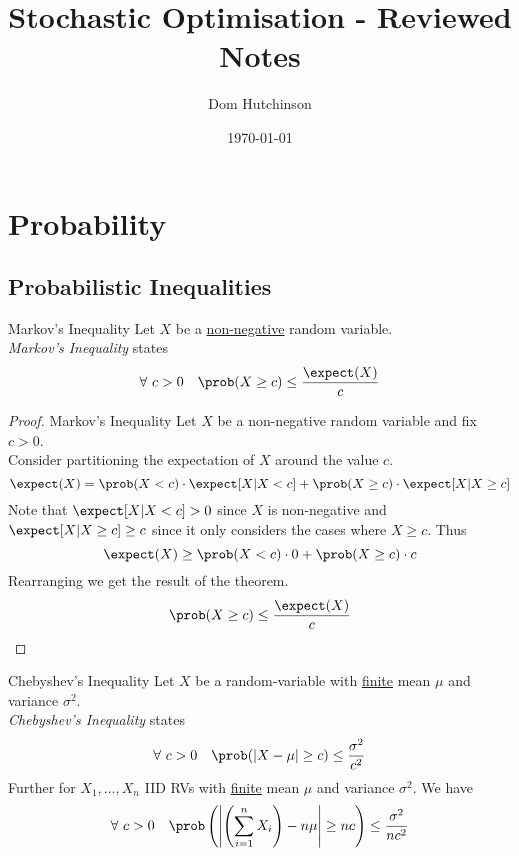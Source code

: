 \documentclass[11pt,a4paper]{article}
\begin{document}
\title{Stochastic Optimisation - Reviewed Notes}
\author{Dom Hutchinson}
\date{\today}
\maketitle

\tableofcontents\newpage

\section{Probability}

\subsection{Probabilistic Inequalities}

  \begin{theorem}{Markov's Inequality}
    Let $X$ be a \underline{non-negative} random variable.\\
    \textit{Markov's Inequality} states
    \[ \forall\ c>0\quad\prob(X\geq c)\leq\frac{\expect(X)}c \]
  \end{theorem}

  \begin{proof}{Markov's Inequality}
    Let $X$ be a non-negative random variable and fix $c>0$.\\
    Consider partitioning the expectation of $X$ around the value $c$.
    \[ \expect(X)=\prob(X<c)\cdot\expect[X|X<c]+\prob(X\geq c)\cdot\expect[X|X\geq c] \]
    Note that $\expect[X|X<c]>0$ since $X$ is non-negative and $\expect[X|X\geq c]\geq c$ since it only considers the cases where $X\geq c$. Thus
    \[ \expect(X)\geq\prob(X<c)\cdot0+\prob(X\geq c)\cdot c \]
    Rearranging we get the result of the theorem.
    \[ \prob(X\geq c)\leq\frac{\expect(X)}c \]
    \proved
  \end{proof}

  \begin{theorem}{Chebyshev's Inequality}
    Let $X$ be a random-variable with \underline{finite} mean $\mu$ and variance $\sigma^2$.\\
    \textit{Chebyshev's Inequality} states
    \[ \forall\ c>0\quad\prob(|X-\mu|\geq c)\leq\frac{\sigma^2}{c^2}\]
    Further for $X_1,\dots,X_n$ IID RVs with \underline{finite} mean $\mu$ and variance $\sigma^2$. We have
    \[ \forall\ c>0\quad\prob\left(\left|\left(\sum_{i=1}^nX_i\right)-n\mu\right|\geq nc\right)\leq\frac{\sigma^2}{nc^2} \]
  \end{theorem}
\end{document}
